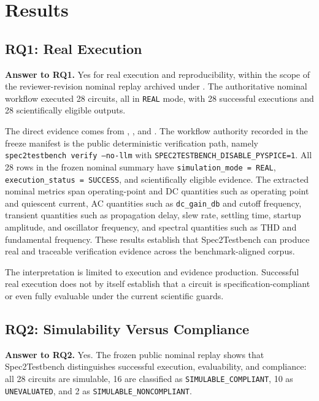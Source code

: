 \section{Results}

\subsection{RQ1: Real Execution}
\textbf{Answer to RQ1.} Yes for real execution and reproducibility, within the scope of the reviewer-revision nominal replay archived under . The authoritative nominal workflow executed 28 circuits, all in \texttt{REAL} mode, with 28 successful executions and 28 scientifically eligible outputs.

The direct evidence comes from , , and . The workflow authority recorded in the freeze manifest is the public deterministic verification path, namely \texttt{spec2testbench verify --no-llm} with \texttt{SPEC2TESTBENCH\_DISABLE\_PYSPICE=1}. All 28 rows in the frozen nominal summary have \texttt{simulation\_mode = REAL}, \texttt{execution\_status = SUCCESS}, and scientifically eligible evidence. The extracted nominal metrics span operating-point and DC quantities such as operating point and quiescent current, AC quantities such as \texttt{dc\_gain\_db} and cutoff frequency, transient quantities such as propagation delay, slew rate, settling time, startup amplitude, and oscillator frequency, and spectral quantities such as THD and fundamental frequency. These results establish that Spec2Testbench can produce real and traceable verification evidence across the benchmark-aligned corpus.

The interpretation is limited to execution and evidence production. Successful real execution does not by itself establish that a circuit is specification-compliant or even fully evaluable under the current scientific guards.

\subsection{RQ2: Simulability Versus Compliance}
\textbf{Answer to RQ2.} Yes. The frozen public nominal replay shows that Spec2Testbench distinguishes successful execution, evaluability, and compliance: all 28 circuits are simulable, 16 are classified as \texttt{SIMULABLE\_COMPLIANT}, 10 as \texttt{UNEVALUATED}, and 2 as \texttt{SIMULABLE\_NONCOMPLIANT}.

